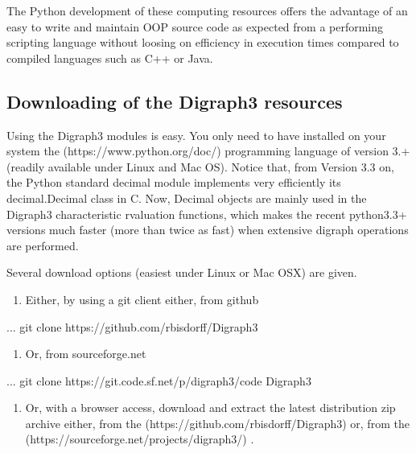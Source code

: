 \documentclass[a4paper,12pt,english]{sphinxhowto}
\begin{document}
The Python development of these computing resources offers the advantage of an easy to write and maintain OOP source code as expected from a performing scripting language without loosing on efficiency in execution times compared to compiled languages such as C++ or Java.


\subsection{Downloading of the Digraph3 resources}
\label{\detokenize{tutorial:downloading-of-the-digraph3-resources}}
Using the Digraph3 modules is easy. You only need to have installed on your system the  (https://www.python.org/doc/) programming language of version 3.+ (readily available under Linux and Mac OS). Notice that, from Version 3.3 on, the Python standard decimal module implements very efficiently its decimal.Decimal class in C. Now, Decimal objects are mainly used in the Digraph3 characteristic r\sphinxhyphen{}valuation functions, which makes the recent python\sphinxhyphen{}3.3+ versions much faster (more than twice as fast) when extensive digraph operations are performed.

Several download options (easiest under Linux or Mac OS\sphinxhyphen{}X) are given.
\begin{enumerate}
%
\item {} 
Either, by using a git client either, from github

\end{enumerate}

\begin{sphinxVerbatim}[commandchars=\\\{\}]
...\PYGZdl{} git clone https://github.com/rbisdorff/Digraph3
\end{sphinxVerbatim}
\begin{enumerate}
%
\setcounter{enumi}{1}
\item {} 
Or, from sourceforge.net

\end{enumerate}

\begin{sphinxVerbatim}[commandchars=\\\{\}]
...\PYGZdl{} git clone https://git.code.sf.net/p/digraph3/code Digraph3
\end{sphinxVerbatim}
\begin{enumerate}
%
\setcounter{enumi}{2}
\item {} 
Or, with a browser access, download and extract the latest distribution zip archive either, from the  (https://github.com/rbisdorff/Digraph3)  or, from the  (https://sourceforge.net/projects/digraph3/) .

\end{enumerate}
\end{document}
